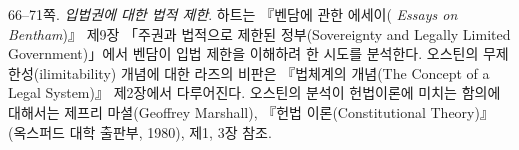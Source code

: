 {66--71쪽. \emph{입법권에 대한 법적 제한}. 하트는 『벤담에 관한 에세이(
\emph{Essays on Bentham})』 제9장 「주권과 법적으로 제한된
정부(Sovereignty and Legally Limited Government)」에서 벤담이 입법
제한을 이해하려 한 시도를 분석한다. 오스틴의 무제한성(ilimitability)
개념에 대한 라즈의 비판은 『법체계의 개념(The Concept of a Legal
System)』 제2장에서 다루어진다. 오스틴의 분석이 헌법이론에 미치는 함의에
대해서는 제프리 마셜(Geoffrey Marshall), 『헌법 이론(Constitutional
Theory)』(옥스퍼드 대학 출판부, 1980), 제1, 3장 참조.

}